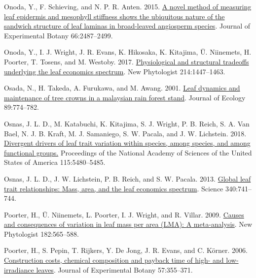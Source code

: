 \documentclass[
  12pt,
  a4paper,
,tablecaptionabove
]{scrartcl}
\newlength{\cslhangindent}
\newenvironment{CSLReferences}[2] %
 {%
  \setlength{\parindent}{0pt}
  \ifodd #1 \everypar{\setlength{\hangindent}{\cslhangindent}}\ignorespaces\fi
  \ifnum #2 > 0
  \setlength{\parskip}{#2\baselineskip}
  \fi
 }%
 {}
\begin{document}
\begin{CSLReferences}{1}{0}
\leavevmode{}%
Onoda, Y., F. Schieving, and N. P. R. Anten. 2015. \href{https://doi.org/10.1093/jxb/erv024}{A novel method of measuring leaf epidermis and mesophyll stiffness shows the ubiquitous nature of the sandwich structure of leaf laminas in broad-leaved angiosperm species}. Journal of Experimental Botany 66:2487--2499.

\leavevmode{}%
Onoda, Y., I. J. Wright, J. R. Evans, K. Hikosaka, K. Kitajima, Ü. Niinemets, H. Poorter, T. Tosens, and M. Westoby. 2017. \href{https://doi.org/10.1111/nph.14496}{Physiological and structural tradeoffs underlying the leaf economics spectrum}. New Phytologist 214:1447--1463.

\leavevmode{}%
Osada, N., H. Takeda, A. Furukawa, and M. Awang. 2001. \href{https://doi.org/10.1046/j.0022-0477.2001.00590.x}{Leaf dynamics and maintenance of tree crowns in a malaysian rain forest stand}. Journal of Ecology 89:774--782.

\leavevmode{}%
Osnas, J. L. D., M. Katabuchi, K. Kitajima, S. J. Wright, P. B. Reich, S. A. Van Bael, N. J. B. Kraft, M. J. Samaniego, S. W. Pacala, and J. W. Lichstein. 2018. \href{https://doi.org/10.1073/pnas.1803989115}{Divergent drivers of leaf trait variation within species, among species, and among functional groups.} Proceedings of the National Academy of Sciences of the United States of America 115:5480--5485.

\leavevmode{}%
Osnas, J. L. D., J. W. Lichstein, P. B. Reich, and S. W. Pacala. 2013. \href{https://doi.org/10.1126/science.1231574}{Global leaf trait relationships: {Mass}, area, and the leaf economics spectrum}. Science 340:741--744.

\leavevmode{}%
Poorter, H., Ü. Niinemets, L. Poorter, I. J. Wright, and R. Villar. 2009. \href{https://doi.org/10.1111/j.1469-8137.2009.02830.x}{Causes and consequences of variation in leaf mass per area ({LMA}): {A} meta-analysis}. New Phytologist 182:565--588.

\leavevmode{}%
Poorter, H., S. Pepin, T. Rijkers, Y. De Jong, J. R. Evans, and C. Körner. 2006. \href{https://doi.org/10.1093/jxb/erj002}{Construction costs, chemical composition and payback time of high- and low-irradiance leaves}. Journal of Experimental Botany 57:355--371.


\end{CSLReferences}
\end{document}

